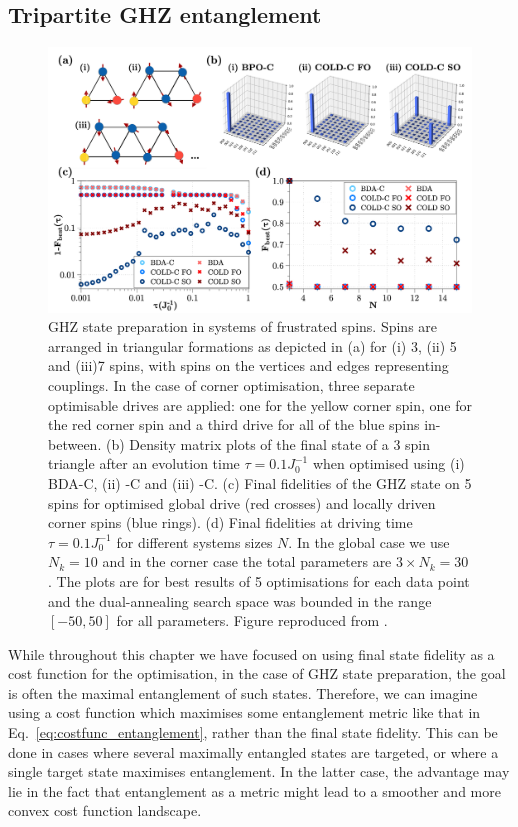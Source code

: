 \subsection{Tripartite GHZ entanglement}\label{sec:6.4.1_t3}

\begin{figure}[t!]
    \centering
    \includegraphics[width=\linewidth]{images_v1/frustrated.png} \caption[Preparation of GHZ states in a system of frustrated spins.]{GHZ state preparation in systems of frustrated spins. Spins are arranged in triangular formations as depicted in (a) for (i) 3, (ii) 5 and (iii)7 spins, with spins on the vertices and edges representing couplings.  In the case of corner optimisation, three separate optimisable drives are applied: one for the yellow corner spin, one for the red corner spin and a third drive for all of the blue spins in-between. (b) Density matrix plots of the final state of a 3 spin triangle after an evolution time $\tau = 0.1J_0^{-1}$ when optimised using (i) BDA-C, (ii)  -C and (iii)  -C. (c) Final fidelities of the GHZ state on 5 spins for optimised global drive (red crosses) and locally driven corner spins (blue rings). (d) Final fidelities at driving time $\tau = 0.1J_0^{-1}$ for different systems sizes $N$. In the global case we use $N_k = 10$ and in the corner case the total parameters are $3 \times N_k = 30$. The plots are for best results of 5 optimisations for each data point and the dual-annealing search space was bounded in the range $[-50, 50]$ for all parameters. Figure reproduced from \cite{cepaite_cold_2023}.} \label{fig:ghz_mainfig}
\end{figure}

While throughout this chapter we have focused on using final state fidelity as a cost function for the optimisation, in the case of GHZ state preparation, the goal is often the maximal entanglement of such states. Therefore, we can imagine using a cost function which maximises some entanglement metric like that in Eq.~\eqref{eq:costfunc_entanglement}, rather than the final state fidelity. This can be done in cases where several maximally entangled states are targeted, or where a single target state maximises entanglement. In the latter case, the advantage may lie in the fact that entanglement as a metric might lead to a smoother and more convex cost function landscape.

